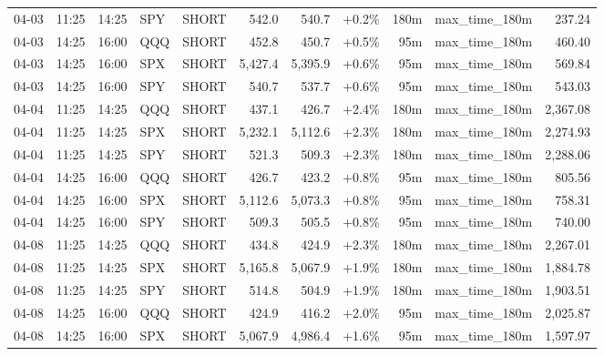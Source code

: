 \documentclass[11pt,a4paper,twoside]{article}
\begin{document}
\begin{center}
\begin{longtable}{>{\color{txtmain}}l l l l l r r r r >{\color{txtmain}}l r}
04-03 & 11:25 & 14:25 & SPY & SHORT & 542.0 & 540.7 & \textcolor{wingreen}{+0.2\%} & 180m & max\_time\_180m & \textcolor{wingreen}{237.24} \\
04-03 & 14:25 & 16:00 & QQQ & SHORT & 452.8 & 450.7 & \textcolor{wingreen}{+0.5\%} & 95m & max\_time\_180m & \textcolor{wingreen}{460.40} \\
04-03 & 14:25 & 16:00 & SPX & SHORT & 5,427.4 & 5,395.9 & \textcolor{wingreen}{+0.6\%} & 95m & max\_time\_180m & \textcolor{wingreen}{569.84} \\
04-03 & 14:25 & 16:00 & SPY & SHORT & 540.7 & 537.7 & \textcolor{wingreen}{+0.6\%} & 95m & max\_time\_180m & \textcolor{wingreen}{543.03} \\
04-04 & 11:25 & 14:25 & QQQ & SHORT & 437.1 & 426.7 & \textcolor{wingreen}{+2.4\%} & 180m & max\_time\_180m & \textcolor{wingreen}{2,367.08} \\
04-04 & 11:25 & 14:25 & SPX & SHORT & 5,232.1 & 5,112.6 & \textcolor{wingreen}{+2.3\%} & 180m & max\_time\_180m & \textcolor{wingreen}{2,274.93} \\
04-04 & 11:25 & 14:25 & SPY & SHORT & 521.3 & 509.3 & \textcolor{wingreen}{+2.3\%} & 180m & max\_time\_180m & \textcolor{wingreen}{2,288.06} \\
04-04 & 14:25 & 16:00 & QQQ & SHORT & 426.7 & 423.2 & \textcolor{wingreen}{+0.8\%} & 95m & max\_time\_180m & \textcolor{wingreen}{805.56} \\
04-04 & 14:25 & 16:00 & SPX & SHORT & 5,112.6 & 5,073.3 & \textcolor{wingreen}{+0.8\%} & 95m & max\_time\_180m & \textcolor{wingreen}{758.31} \\
04-04 & 14:25 & 16:00 & SPY & SHORT & 509.3 & 505.5 & \textcolor{wingreen}{+0.8\%} & 95m & max\_time\_180m & \textcolor{wingreen}{740.00} \\
04-08 & 11:25 & 14:25 & QQQ & SHORT & 434.8 & 424.9 & \textcolor{wingreen}{+2.3\%} & 180m & max\_time\_180m & \textcolor{wingreen}{2,267.01} \\
04-08 & 11:25 & 14:25 & SPX & SHORT & 5,165.8 & 5,067.9 & \textcolor{wingreen}{+1.9\%} & 180m & max\_time\_180m & \textcolor{wingreen}{1,884.78} \\
04-08 & 11:25 & 14:25 & SPY & SHORT & 514.8 & 504.9 & \textcolor{wingreen}{+1.9\%} & 180m & max\_time\_180m & \textcolor{wingreen}{1,903.51} \\
04-08 & 14:25 & 16:00 & QQQ & SHORT & 424.9 & 416.2 & \textcolor{wingreen}{+2.0\%} & 95m & max\_time\_180m & \textcolor{wingreen}{2,025.87} \\
04-08 & 14:25 & 16:00 & SPX & SHORT & 5,067.9 & 4,986.4 & \textcolor{wingreen}{+1.6\%} & 95m & max\_time\_180m & \textcolor{wingreen}{1,597.97} \\

\end{longtable}
\end{center}
\end{document}
